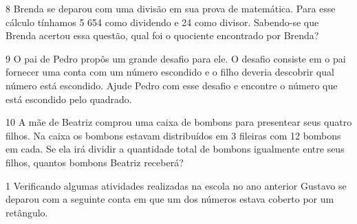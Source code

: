 


\num{8} Brenda se deparou com uma divisão em sua prova de matemática. Para
esse cálculo tínhamos 5 654 como dividendo e 24 como divisor. Sabendo-se
que Brenda acertou essa questão, qual foi o quociente encontrado por
Brenda?



\num{9} O pai de Pedro propôs um grande desafio para ele. O desafio
consiste em o pai fornecer uma conta com um número escondido e o filho
deveria descobrir qual número está escondido. Ajude Pedro com esse
desafio e encontre o número que está escondido pelo quadrado.



\num{10} A mãe de Beatriz comprou uma caixa de bombons para presentear seus
quatro filhos. Na caixa os bombons estavam distribuídos em 3 fileiras
com 12 bombons em cada. Se ela irá dividir a quantidade total de bombons
igualmente entre seus filhos, quantos bombons Beatriz receberá?




\num{1} Verificando algumas atividades realizadas na escola no ano anterior
Gustavo se deparou com a seguinte conta em que um dos números estava
coberto por um retângulo.

